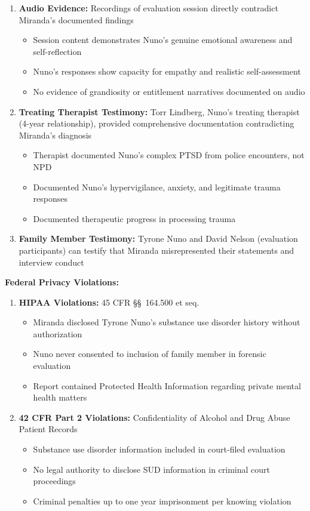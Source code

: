 \documentclass[11pt, letterpaper]{article}
\begin{document}
\begin{enumerate}[leftmargin=*,itemsep=3pt]
    \item \textbf{Audio Evidence:} Recordings of evaluation session directly contradict Miranda's documented findings
    \begin{itemize}[leftmargin=*,itemsep=1pt]
        \item Session content demonstrates Nuno's genuine emotional awareness and self-reflection
        \item Nuno's responses show capacity for empathy and realistic self-assessment
        \item No evidence of grandiosity or entitlement narratives documented on audio
    \end{itemize}
    \item \textbf{Treating Therapist Testimony:} Torr Lindberg, Nuno's treating therapist (4-year relationship), provided comprehensive documentation contradicting Miranda's diagnosis
    \begin{itemize}[leftmargin=*,itemsep=1pt]
        \item Therapist documented Nuno's complex PTSD from police encounters, not NPD
        \item Documented Nuno's hypervigilance, anxiety, and legitimate trauma responses
        \item Documented therapeutic progress in processing trauma
    \end{itemize}
    \item \textbf{Family Member Testimony:} Tyrone Nuno and David Nelson (evaluation participants) can testify that Miranda misrepresented their statements and interview conduct
\end{enumerate}

\textbf{Federal Privacy Violations:}
\begin{enumerate}[leftmargin=*,itemsep=2pt]
    \item \textbf{HIPAA Violations:} 45 CFR \S\S\ 164.500 et seq.
    \begin{itemize}[leftmargin=*,itemsep=1pt]
        \item Miranda disclosed Tyrone Nuno's substance use disorder history without authorization
        \item Nuno never consented to inclusion of family member in forensic evaluation
        \item Report contained Protected Health Information regarding private mental health matters
    \end{itemize}
    \item \textbf{42 CFR Part 2 Violations:} Confidentiality of Alcohol and Drug Abuse Patient Records
    \begin{itemize}[leftmargin=*,itemsep=1pt]
        \item Substance use disorder information included in court-filed evaluation
        \item No legal authority to disclose SUD information in criminal court proceedings
        \item Criminal penalties up to one year imprisonment per knowing violation
    \end{itemize}
\end{enumerate}
\end{document}
